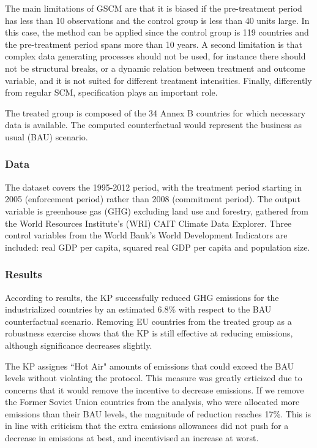 \documentclass[12pt,a4paper,draft]{article}
\begin{document}
The main limitations of GSCM are that it is biased if the pre-treatment period has less than 10 
observations and the control group is less than 40 units large. In this case, the method can be 
applied since the control group is 119 countries and the pre-treatment period spans more than 10 
years. A second limitation is that complex data generating processes should not be used, for instance 
there should not be structural breaks, or a dynamic relation between treatment and outcome variable, 
and it is not suited for different treatment intensities. 
Finally, differently from regular SCM, specification plays an important role.

The treated group is composed of the 34 Annex B countries for which necessary data is available. 
The computed counterfactual would represent the business as usual (BAU) scenario. 


\subsubsection*{Data}
The dataset covers the 1995-2012 period, with the treatment period starting in 2005 (enforcement 
period) rather than 2008 (commitment period). The output variable is greenhouse gas (GHG) excluding 
land use and forestry, gathered from the World Resources Institute's (WRI) CAIT Climate Data Explorer. 
Three control variables from the World Bank's World Development Indicators are included: real GDP 
per capita, squared real GDP per capita and population size.

\subsubsection*{Results}
According to results, the KP successfully reduced GHG emissions for the industrialized countries by 
an estimated 6.8\% with respect to the BAU counterfactual scenario. Removing EU countries from the 
treated group as a robustness exercise shows that the KP is still effective at reducing emissions, 
although significance decreases slightly.

The KP assignes ``Hot Air" amounts of emissions that could exceed the BAU levels without violating 
the protocol. This measure was greatly crticized due to concerns that it would remove the incentive 
to decrease emissions. If we remove the Former Soviet Union countries from the analysis, who were 
allocated more emissions than their BAU levels, the magnitude of reduction reaches 17\%. This is in 
line with criticism that the extra emissions allowances did not push for a decrease in emissions at 
best, and incentivised an increase at worst. 
\end{document}
